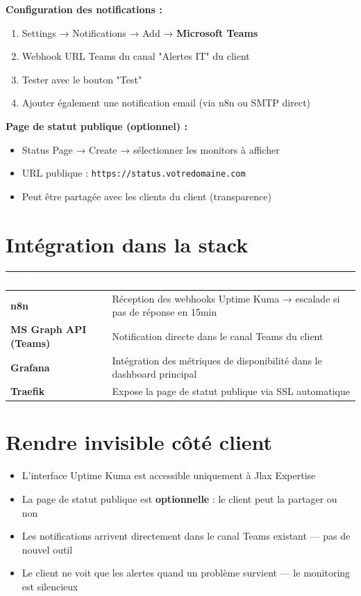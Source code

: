 \documentclass[11pt, a4paper]{article}
\begin{document}
\textbf{Configuration des notifications :}
\begin{enumerate}
  \item Settings → Notifications → Add → \textbf{Microsoft Teams}
  \item Webhook URL Teams du canal "Alertes IT" du client
  \item Tester avec le bouton "Test"
  \item Ajouter également une notification email (via n8n ou SMTP direct)
\end{enumerate}

\textbf{Page de statut publique (optionnel) :}
\begin{itemize}
  \item Status Page → Create → sélectionner les monitors à afficher
  \item URL publique : \texttt{https://status.votredomaine.com}
  \item Peut être partagée avec les clients du client (transparence)
\end{itemize}

\section{Intégration dans la stack}

\begin{center}
\renewcommand{\arraystretch}{1.4}
\begin{tabularx}{\linewidth}{>{\bfseries}p{2.8cm} X}
\toprule
\rowcolor{tabheader}
\textcolor{white}{\textbf{Outil}} & \textcolor{white}{\textbf{Rôle}} \\
\midrule
n8n & Réception des webhooks Uptime Kuma → escalade si pas de réponse en 15min \\
\rowcolor{rowgray}
MS Graph API (Teams) & Notification directe dans le canal Teams du client \\
Grafana & Intégration des métriques de disponibilité dans le dashboard principal \\
\rowcolor{rowgray}
Traefik & Expose la page de statut publique via SSL automatique \\
\bottomrule
\end{tabularx}
\end{center}

\section{Rendre invisible côté client}

\begin{itemize}
  \item L'interface Uptime Kuma est accessible uniquement à Jlax Expertise
  \item La page de statut publique est \textbf{optionnelle} : le client peut la partager ou non
  \item Les notifications arrivent directement dans le canal Teams existant — pas de nouvel outil
  \item Le client ne voit que les alertes quand un problème survient — le monitoring est silencieux
\end{itemize}
\end{document}
